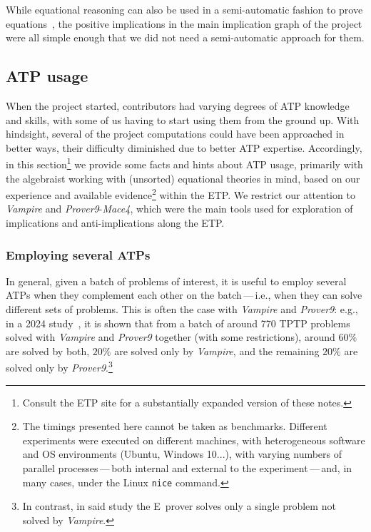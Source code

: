 \documentclass[12pt]{amsart}
\theoremstyle{definition}
\begin{document}

While equational reasoning can also be used in a semi-automatic fashion to prove equations~\cite{DBLP:journals/pacmpl/KoehlerGBGTS24}, the positive implications in the main implication graph of the project were all simple enough that we did not need a semi-automatic approach for them.

\subsection{ATP usage}\label{ATP_usage}

When the project started, contributors had varying degrees of ATP knowledge and skills, with some of us having to start using them from the ground up. With hindsight, several of the project computations could have been approached in better ways, their difficulty diminished due to better ATP expertise. Accordingly, in this section\footnote{Consult the ETP site for a substantially expanded version of these notes.} we provide some facts and hints about ATP usage, primarily with the algebraist working with (unsorted) equational theories in mind, based on our experience and available evidence\footnote{The timings presented here cannot be taken as benchmarks. Different experiments were executed on different machines, with heterogeneous software and OS environments (Ubuntu, Windows 10...), with varying numbers of parallel processes\,---\,both internal and external to the experiment\,---\,and, in many cases, under the Linux \Verb|nice| command.} within the ETP\@. We restrict our attention to \emph{Vampire} and \emph{Prover9}-\emph{Mace4}, which were the main tools used for exploration of implications and anti-implications along the ETP\@.

\subsubsection{Employing several ATPs}
In general, given a batch of problems of interest, it is useful to employ several ATPs when they complement each other on the batch\,---\,i.e., when they can solve different sets of problems. This is often the case with \emph{Vampire} and \emph{Prover9}: e.g., in a 2024 study~\cite{LPAR2024:Prover9_Unleashed_Automated_Configuration}, it is shown that from a batch of around 770 TPTP problems solved with \emph{Vampire} and \emph{Prover9} together (with some restrictions), around $60\%$ are solved by both, $20\%$ are solved only by \emph{Vampire}, and the remaining $20\%$ are solved only by \emph{Prover9}.\footnote{In contrast, in said study the E~prover solves only a single problem not solved by \emph{Vampire}.}
\end{document}
